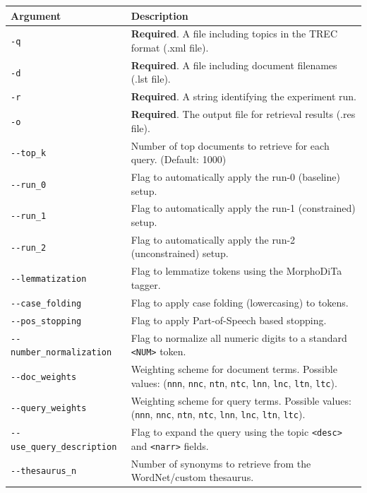\documentclass[a4paper, 12pt]{article}
\begin{document}
\begin{table}[htbp]
\centering
\begin{tabular}{|l|p{10cm}|}
\hline
\textbf{Argument} & \textbf{Description} \\
\hline
\texttt{-q} & \textbf{Required}. A file including topics in the TREC format (.xml file). \\ \hline
\texttt{-d} & \textbf{Required}. A file including document filenames (.lst file). \\ \hline
\texttt{-r} & \textbf{Required}. A string identifying the experiment run. \\ \hline
\texttt{-o} & \textbf{Required}. The output file for retrieval results (.res file). \\ \hline
\texttt{{-}{-}top\_k} & Number of top documents to retrieve for each query. (Default: 1000) \\ \hline
\texttt{{-}{-}run\_0} & Flag to automatically apply the run-0 (baseline) setup. \\ \hline
\texttt{{-}{-}run\_1} & Flag to automatically apply the run-1 (constrained) setup. \\ \hline
\texttt{{-}{-}run\_2} & Flag to automatically apply the run-2 (unconstrained) setup. \\ \hline
\texttt{{-}{-}lemmatization} & Flag to lemmatize tokens using the MorphoDiTa tagger. \\ \hline
\texttt{{-}{-}case\_folding} & Flag to apply case folding (lowercasing) to tokens. \\ \hline
\texttt{{-}{-}pos\_stopping} & Flag to apply Part-of-Speech based stopping. \\ \hline
\texttt{{-}{-}number\_normalization} & Flag to normalize all numeric digits to a standard \texttt{<NUM>} token. \\ \hline
\texttt{{-}{-}doc\_weights} & Weighting scheme for document terms. Possible values: (\texttt{nnn}, \texttt{nnc}, \texttt{ntn}, \texttt{ntc}, \texttt{lnn}, \texttt{lnc}, \texttt{ltn}, \texttt{ltc}). \\ \hline
\texttt{{-}{-}query\_weights} & Weighting scheme for query terms. Possible values: (\texttt{nnn}, \texttt{nnc}, \texttt{ntn}, \texttt{ntc}, \texttt{lnn}, \texttt{lnc}, \texttt{ltn}, \texttt{ltc}). \\ \hline
\texttt{{-}{-}use\_query\_description} & Flag to expand the query using the topic \texttt{<desc>} and \texttt{<narr>} fields. \\ \hline
\texttt{{-}{-}thesaurus\_n} & Number of synonyms to retrieve from the WordNet/custom thesaurus. \\ \hline

\end{tabular}
\end{table}
\end{document}
